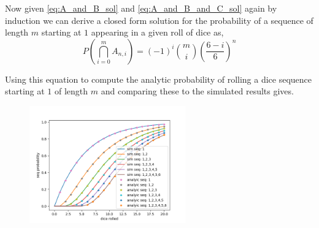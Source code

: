 \documentclass[12pt,a4paper]{article}
\begin{document}
Now given \cref{eq:A_and_B_sol} and \cref{eq:A_and_B_and_C_sol} again by induction we can derive a closed form solution for the probability of a sequence of length $m$ starting at $1$ appearing in a given roll of dice as,
\begin{equation}
P\left(\bigcap_{i=0}^m A_{n,i}\right) = (-1)^i \binom{m}{i}\left( \frac{6-i}{6} \right)^n
\end{equation}

Using this equation to compute the analytic probability of rolling a dice sequence starting at $1$ of length $m$ and comparing these to the simulated results gives.

\begin{figure}[H]
    \centering
    \includegraphics[width=0.6\textwidth]{figs/full_compare_analytic_sim.png}
    \caption{}
    \label{fig:full_compare_analytic_sim}
\end{figure}
\end{document}
